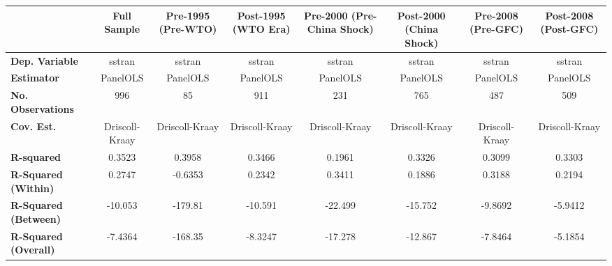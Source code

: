 \begin{center}
\begin{tabular}{lccccccc}
\toprule
                                   & \textbf{Full Sample} & \textbf{Pre-1995 (Pre-WTO)} & \textbf{Post-1995 (WTO Era)} & \textbf{Pre-2000 (Pre-China Shock)} & \textbf{Post-2000 (China Shock)} & \textbf{Pre-2008 (Pre-GFC)} & \textbf{Post-2008 (Post-GFC)}  \\
\midrule
\textbf{Dep. Variable}             &        sstran        &            sstran           &            sstran            &                sstran               &              sstran              &            sstran           &             sstran             \\
\textbf{Estimator}                 &       PanelOLS       &           PanelOLS          &           PanelOLS           &               PanelOLS              &             PanelOLS             &           PanelOLS          &            PanelOLS            \\
\textbf{No. Observations}          &         996          &              85             &             911              &                 231                 &               765                &             487             &              509               \\
\textbf{Cov. Est.}                 &    Driscoll-Kraay    &        Driscoll-Kraay       &        Driscoll-Kraay        &            Driscoll-Kraay           &          Driscoll-Kraay          &        Driscoll-Kraay       &         Driscoll-Kraay         \\
\textbf{R-squared}                 &        0.3523        &            0.3958           &            0.3466            &                0.1961               &              0.3326              &            0.3099           &             0.3303             \\
\textbf{R-Squared (Within)}        &        0.2747        &           -0.6353           &            0.2342            &                0.3411               &              0.1886              &            0.3188           &             0.2194             \\
\textbf{R-Squared (Between)}       &       -10.053        &           -179.81           &           -10.591            &               -22.499               &             -15.752              &           -9.8692           &            -5.9412             \\
\textbf{R-Squared (Overall)}       &       -7.4364        &           -168.35           &           -8.3247            &               -17.278               &             -12.867              &           -7.8464           &            -5.1854             \\

\end{tabular}
\end{center}
